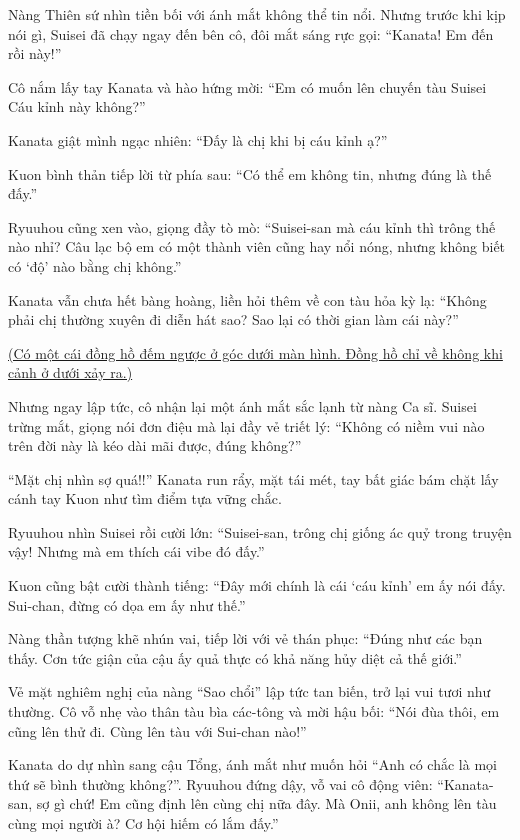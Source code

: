 \documentclass[../main.tex]{subfiles}
\begin{document}
Nàng Thiên sứ nhìn tiền bối với ánh mắt không thể tin nổi. Nhưng trước khi kịp nói gì, Suisei đã chạy ngay đến bên cô, đôi mắt sáng rực gọi: ``Kanata! Em đến rồi này!''

Cô nắm lấy tay Kanata và hào hứng mời: ``Em có muốn lên chuyến tàu Suisei Cáu kỉnh này không?''

Kanata giật mình ngạc nhiên: ``Đấy là chị khi bị cáu kỉnh ạ?''

Kuon bình thản tiếp lời từ phía sau: ``Có thể em không tin, nhưng đúng là thế đấy.''

Ryuuhou cũng xen vào, giọng đầy tò mò: ``Suisei-san mà cáu kỉnh thì trông thế nào nhỉ? Câu lạc bộ em có một thành viên cũng hay nổi nóng, nhưng không biết có `độ' nào bằng chị không.''

Kanata vẫn chưa hết bàng hoàng, liền hỏi thêm về con tàu hỏa kỳ lạ: ``Không phải chị thường xuyên đi diễn hát sao? Sao lại có thời gian làm cái này?''

\begin{center}
  \uline{(Có một cái đồng hồ đếm ngược ở góc dưới màn hình. Đồng hồ chỉ về không khi cảnh ở dưới xảy ra.)}
\end{center}

Nhưng ngay lập tức, cô nhận lại một ánh mắt sắc lạnh từ nàng Ca sĩ. Suisei trừng mắt, giọng nói đơn điệu mà lại đầy vẻ triết lý: ``Không có niềm vui nào trên đời này là kéo dài mãi được, đúng không?''


``Mặt chị nhìn sợ quá!!'' Kanata run rẩy, mặt tái mét, tay bất giác bám chặt lấy cánh tay Kuon như tìm điểm tựa vững chắc.

Ryuuhou nhìn Suisei rồi cười lớn: ``Suisei-san, trông chị giống ác quỷ trong truyện vậy! Nhưng mà em thích cái vibe đó đấy.''

Kuon cũng bật cười thành tiếng: ``Đây mới chính là cái `cáu kỉnh' em ấy nói đấy. Sui-chan, đừng có dọa em ấy như thế.''

Nàng thần tượng khẽ nhún vai, tiếp lời với vẻ thán phục: ``Đúng như các bạn thấy. Cơn tức giận của cậu ấy quả thực có khả năng hủy diệt cả thế giới.''

Vẻ mặt nghiêm nghị của nàng ``Sao chổi'' lập tức tan biến, trở lại vui tươi như thường. Cô vỗ nhẹ vào thân tàu bìa các-tông và mời hậu bối: ``Nói đùa thôi, em cũng lên thử đi. Cùng lên tàu với Sui-chan nào!''

Kanata do dự nhìn sang cậu Tổng, ánh mắt như muốn hỏi ``Anh có chắc là mọi thứ sẽ bình thường không?''. Ryuuhou đứng dậy, vỗ vai cô động viên: ``Kanata-san, sợ gì chứ! Em cũng định lên cùng chị nữa đây. Mà Onii, anh không lên tàu cùng mọi người à? Cơ hội hiếm có lắm đấy.''
\end{document}
